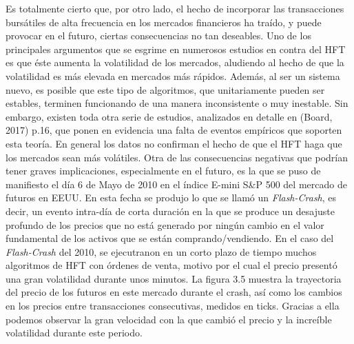 \documentclass[]{DissertateUSU}
\begin{document}
\setlength\parskip{5ex}

\noindent Es totalmente cierto que, por otro lado, el hecho de
incorporar las transacciones bursátiles de alta frecuencia en los
mercados financieros ha traído, y puede provocar en el futuro, ciertas
consecuencias no tan deseables. Uno de los principales argumentos que se
esgrime en numerosos estudios en contra del HFT es que éste aumenta la
volatilidad de los mercados, aludiendo al hecho de que la volatilidad es
más elevada en mercados más rápidos. Además, al ser un sistema nuevo, es
posible que este tipo de algoritmos, que unitariamente pueden ser
estables, terminen funcionando de una manera inconsistente o muy
inestable. Sin embargo, existen toda otra serie de estudios, analizados
en detalle en (Board, 2017) p.16, que ponen en evidencia una falta de
eventos empíricos que soporten esta teoría. En general los datos no
confirman el hecho de que el HFT haga que los mercados sean más
volátiles. Otra de las consecuencias negativas que podrían tener graves
implicaciones, especialmente en el futuro, es la que se puso de
manifiesto el día 6 de Mayo de 2010 en el índice E-mini S\&P 500 del
mercado de futuros en EEUU. En esta fecha se produjo lo que se llamó un
\emph{Flash-Crash}, es decir, un evento intra-día de corta duración en
la que se produce un desajuste profundo de los precios que no está
generado por ningún cambio en el valor fundamental de los activos que se
están comprando/vendiendo. En el caso del \emph{Flash-Crash} del 2010,
se ejecutranon en un corto plazo de tiempo muchos algoritmos de HFT con
órdenes de venta, motivo por el cual el precio presentó una gran
volatilidad durante unos minutos. La figura 3.5 muestra la trayectoria
del precio de los futuros en este mercado durante el crash, así como los
cambios en los precios entre transacciones consecutivas, medidos en
ticks. Gracias a ella podemos observar la gran velocidad con la que
cambió el precio y la increíble volatilidad durante este periodo.

\centering
\end{document}
